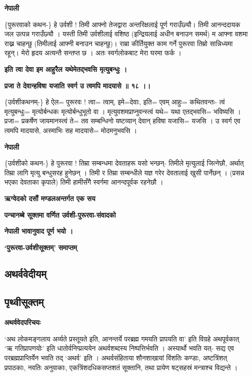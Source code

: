\documentclass[11pt, a5paper]{article}
\begin{document}
\textbf{नेपाली}

\{पुरूरवाको कथन-\} हे उर्वशी ! तिमी आफ्नो तेजद्वारा अन्तरिक्षलाई पूर्ण गराउँछ्यौ।  तिमी आनन्ददायक जल उत्पन्न गराउँछ्यौ । यस्ती तिमी उर्वशीलाई वशिष्ठ (इन्द्रियलाई अधीन बनाउन समर्थ) म आफ्ना वशमा राख्न चाहन्छु (तिमीलाई आफ्नी बनाउन चाहन्छु)। राम्रा कीर्तियुक्त काम गर्ने पुरूरवा तिम्रो सान्निध्यमा रहून्। मेरो हृदय अत्यन्तै सन्तप्त छ । अतः स्वर्गलोकबाट मेरा घरमा फर्क ।

\textbf{इति त्वा देवा इम आहुरैल यथेमेतद्भवसि मृत्युबन्धुः ।}

\textbf{प्रजा ते देवान्हविषा यजाति स्वर्ग उ त्वमपि मादयासे ॥ १८ ।।}

\{उर्वशीकथनम्-\} हे ऐल= पुरूरवः ! त्वा= त्वाम्, इमे=देवाः, इति= एवम् आहुः= कथितवन्तः- त्वं मृत्युबन्धुः= मृत्योर्बन्धकः मृत्योर्बन्धुभूतो वा । मृत्युवशमप्राप्नुवन्स्त्वं यथे= यथा एतद्भवसि= भविष्यसि । प्रजा= प्रकर्षेण जायमानस्त्वं ते= तव सम्बन्धिनो यष्टव्यान् देवान्  हविषा यजासि= यजसि । उ स्वर्ग एव त्वमपि मादयासे, अस्माभिः सह मादयासे= मोदमनुभवसि ।

\textbf{नेपाली}

\{उर्वशीको कथन-\} हे पुरूरवा ! तिम्रा सम्बन्धमा देवताहरू यसो भन्छन्- तिमीले मृत्युलाई जित्नेछौ, अर्थात् तिम्रा लागि मृत्यु बन्धुसरह हुनेछन् । तिमी र तिम्रा सम्बन्धीले यज्ञ गरेर देवतालाई खुसी पार्नेछन् । (प्रसन्न भएका देवताका कृपाले) तिमी हामीसँगै स्वर्गमा आनन्दपूर्वक रहनेछौ ।

\textbf{ऋग्वेदको दसौं मण्डलअन्तर्गत एक सय}

\textbf{पन्चानब्बे सूक्तमा वर्णित उर्वशी-पुरूरवा-संवादको}

\textbf{नेपाली भावानुवाद पूर्ण भयो ।}

\textbf{‘पुरूरवा-उर्वशीसूक्तम्’ समाप्तम्}

\subsection{\textbf{अथर्ववेदीयम्}}

\subsection{\textbf{पृथ्वीसूक्तम्}}

\textbf{अथर्ववेदपरिचयः}

‘अथ लोकमङ्गलाय अर्व्यते प्रस्तूयते इति, आनन्तर्ये परब्रह्म गमयति प्रापयति वा’ इति विग्रहे अथपूर्वकात् ‘ऋ गतिप्रापणयोः’ इति धातोर्वनिप्प्रत्ययेन अथर्वशब्दस्य निष्पत्तिर्भवति । अस्यार्थो भवति यत्- सद्य एव परब्रह्मप्राप्तिर्येन भवति तद् ‘अथर्व’ इति । अथर्वसंहिताया शौनशाखायां विंशतिः कण्डाः, अष्टत्रिंशत् प्रपाठकाः, नवतिः अनुवाकाः, एकत्रिंशदधिकसप्तशतं सूक्तानि, तथा प्रायेण षट्‌सहस्रं मन्त्राश्च विद्यन्ते ।
\end{document}
